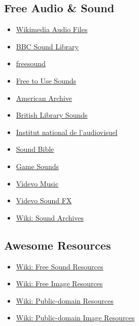 \hypertarget{rsrc:audio}{\subsection{Free Audio \& Sound}}
\begin{itemize}
      \item \href{https://commons.wikimedia.org/wiki/Category:Audio\_files}{Wikimedia Audio Files}
      \item \href{http://bbcsfx.acropolis.org.uk/}{BBC Sound Library}
      \item \href{https://freesound.org/}{freesound}
      \item \href{https://www.freetousesounds.com/sound-library/}{Free to Use Sounds}
      \item \href{https://americanarchive.org/}{American Archive}
      \item \href{https://sounds.bl.uk/}{British Library Sounds}
      \item \href{https://institut.ina.fr/}{Institut national de l'audiovisuel}
      \item \href{http://soundbible.com/}{Sound Bible}
      \item \href{https://gamesounds.xyz/}{Game Sounds}
      \item \href{https://www.videvo.net/royalty-free-music/}{Videvo Music}
      \item \href{https://www.videvo.net/royalty-free-sound-effects/}{Videvo Sound FX}
      \item \href{https://en.wikipedia.org/wiki/List\_of\_sound\_archives}{Wiki: Sound Archives}
\end{itemize}


\hypertarget{rsrc:awesome}{\subsection{Awesome Resources}}
\begin{itemize}
      \item \href{https://en.wikipedia.org/wiki/Wikipedia:Free\_sound\_resources}{Wiki: Free Sound Resources}
      \item \href{https://meta.wikimedia.org/wiki/Free\_image\_resources}{Wiki: Free Image Resources}
      \item \href{https://en.wikipedia.org/wiki/Wikipedia:Public\_domain\_resources}{Wiki: Public-domain Resources}
      \item \href{https://en.wikipedia.org/wiki/Wikipedia:Public\_domain\_image\_resources}{Wiki: Public-domain Image Resources}
\end{itemize}
